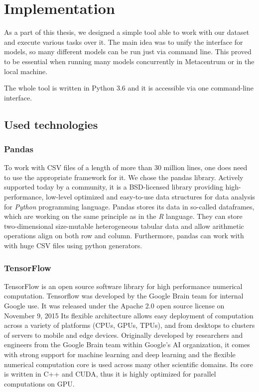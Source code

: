 \chapter{Implementation}
\label{chapter-implementation}

As a part of this thesis, we designed a simple tool able to work with our dataset and execute various tasks over it. The main idea was to unify the interface for models, so many different models can be run just via command line. This proved to be essential when running many models concurrently in Metacentrum or in the local machine. 

The whole tool is written in Python 3.6 and it is accessible via one command-line interface.

\section{Used technologies}

\subsection{Pandas}

To work with CSV files of a length of more than 30 million lines, one does need to use the appropriate framework for it. We chose the pandas\cite{pandas} library. Actively supported today by a community, it is a BSD-licensed library providing high-performance, low-level optimized and easy-to-use data structures for data analysis for \textit{Python} programming language. Pandas stores its data in so-called dataframes\cite{pandas-df}, which are working on the same principle as in the \textit{R} language. They can store two-dimensional size-mutable heterogeneous tabular data and allow arithmetic operations align on both row and column. Furthermore, pandas can work with with huge CSV files using python generators.

\subsection{TensorFlow}

TensorFlow\cite{tensorflow} is an open source software library for high performance numerical computation. Tensorflow was developed by the Google Brain team for internal Google use. It was released under the Apache 2.0 open source license on November 9, 2015 Its flexible architecture allows easy deployment of computation across a variety of platforms (CPUs, GPUs, TPUs), and from desktops to clusters of servers to mobile and edge devices. Originally developed by researchers and engineers from the Google Brain team within Google’s AI organization, it comes with strong support for machine learning and deep learning and the flexible numerical computation core is used across many other scientific domains. Its core is written in C++ and CUDA, thus it is highly optimized for parallel computations on GPU.

